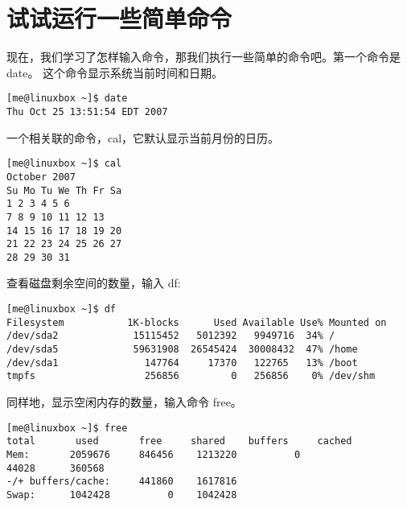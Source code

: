 \section{试试运行一些简单命令}

现在，我们学习了怎样输入命令，那我们执行一些简单的命令吧。第一个命令是 date。 这个命令显示系统当前时间和日期。

\begin{lstlisting}
[me@linuxbox ~]$ date
Thu Oct 25 13:51:54 EDT 2007
\end{lstlisting}

\par 一个相关联的命令，cal，它默认显示当前月份的日历。

\begin{lstlisting}
[me@linuxbox ~]$ cal
October 2007
Su Mo Tu We Th Fr Sa
1 2 3 4 5 6
7 8 9 10 11 12 13
14 15 16 17 18 19 20
21 22 23 24 25 26 27
28 29 30 31
\end{lstlisting}

\par 查看磁盘剩余空间的数量，输入 df:
\begin{lstlisting}
[me@linuxbox ~]$ df
Filesystem           1K-blocks      Used Available Use% Mounted on
/dev/sda2             15115452   5012392   9949716  34% /
/dev/sda5             59631908  26545424  30008432  47% /home
/dev/sda1               147764     17370   122765   13% /boot
tmpfs                   256856         0   256856    0% /dev/shm
\end{lstlisting}

\par 同样地，显示空闲内存的数量，输入命令 free。

\begin{lstlisting}
[me@linuxbox ~]$ free
total       used       free     shared    buffers     cached
Mem:       2059676     846456    1213220          0
44028      360568
-/+ buffers/cache:     441860    1617816
Swap:      1042428          0    1042428
\end{lstlisting}

